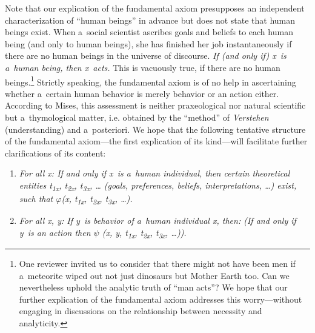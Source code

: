 Note that our explication of the fundamental axiom presupposes an independent characterization of ``human beings'' in advance but does not state that human beings exist. When a~social scientist ascribes goals and beliefs to each human being (and only to human beings), she has finished her job instantaneously if there are no human beings in the universe of discourse. \textit{If (and only if) x~is a~human being, then x~acts.} This is vacuously true, if there are no human beings.\footnote{One reviewer invited us to consider that there might not have been men if a~meteorite wiped out not just dinosaurs but Mother Earth too. Can we nevertheless uphold the analytic truth of ``man acts''? We hope that our further explication of the fundamental axiom addresses this worry---without engaging in discussions on the relationship between necessity and analyticity.} Strictly speaking, the fundamental axiom is of no help in ascertaining whether a~certain human behavior is merely behavior or an action either. According to Mises, this assessment is neither praxeological nor natural scientific but a~thymological matter, i.e. obtained by the ``method'' of \textit{Verstehen} (understanding) and a~posteriori. We hope that the following tentative structure of the fundamental axiom---the first explication of its kind---will facilitate further clarifications of its content:



\begin{enumerate}

\item \textit{For all x: If and only if x~is a~human individual, then certain theoretical entities t}\textit{\textsubscript{1x}}\textit{, t}\textit{\textsubscript{2x}}\textit{, t}\textit{\textsubscript{3x}}\textit{, … (goals, preferences, beliefs, interpretations, …) exist, such that $\varphi $(x, t}\textit{\textsubscript{1x}}\textit{, t}\textit{\textsubscript{2x}}\textit{, t}\textit{\textsubscript{3x}}\textit{, …).}

\item \textit{For all x, y: If y~is behavior of a~human individual x, then: (If and only if y~is an action then $\psi $ (x, y, t}\textit{\textsubscript{1x}}\textit{, t}\textit{\textsubscript{2x}}\textit{, t}\textit{\textsubscript{3x}}\textit{, …)).}

\end{enumerate}

